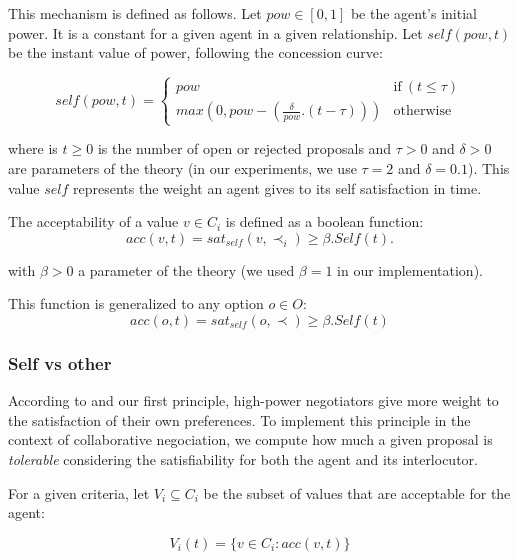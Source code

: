 \documentclass{llncs}
\begin{document}
	 This mechanism is defined as follows. Let $pow \in [0, 1] $ be the agent's initial power. It is a constant for a given agent in a given relationship. Let $self(pow, t)$ be the instant value of power, following the concession curve:
	 
	 \begin{equation}
	 self(pow, t) = \left\{\begin{array}{ll}
	 pow & \mathrm{if\ } (t \leq \tau)\\
	 max(0, pow - (\frac{\delta}{pow} . (t - \tau))) & \mathrm{otherwise}
	 \end{array}\right.
	 \end{equation}
	 
	 where is $t \geq 0$ is the number of open or rejected proposals and $\tau > 0$ and $\delta > 0$
	 are parameters of the theory (in our experiments, we use $\tau=2$ and $\delta=0.1$). This value $self$ represents the weight an agent gives to its self satisfaction in time.
	 
	 The acceptability of a value $v \in C_i$ is defined as a boolean function:
	 \begin{equation}
	 acc(v, t) = sat_{self}(v, \prec_i) \geq  \beta . Self(t).
	 \end{equation}
	 
	 with $\beta>0$ a parameter of the theory (we used $\beta=1$ in our implementation).
	 
	 This function is generalized to any option $o \in O$:
	 \begin{equation}
	 acc(o, t) = sat_{self}(o, \prec) \geq  \beta . Self(t)
	 \end{equation}
	
	\subsubsection {Self vs other}
	According to \cite{ref}  and our first principle, high-power negotiators give more weight to the satisfaction of their own preferences. To implement this principle in the context of collaborative negociation, we compute how much a given proposal is \emph{tolerable} considering the satisfiability for both the agent and its interlocutor.
	
	For a given criteria, let $V_i\subseteq C_i$ be the subset of values that are acceptable for the agent:

	\begin{equation}
	V_i(t) = \{ v\in C_i : acc(v,t) \}
	\end{equation}
	
\end{document}
